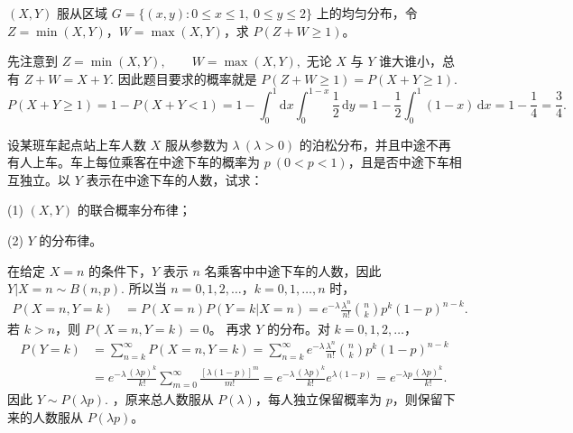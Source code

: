 \documentclass[lang=cn,11pt]{elegantbook}
\begin{document}
\begin{exercise}[min+max=X+Y] \label{exer:3-c10b}
$(X,Y)$ 服从区域 $G=\{(x,y):0\leqslant x\leqslant 1,\ 0\leqslant y\leqslant 2\}$ 上的均匀分布，令 $Z=\min(X,Y)$，$W=\max(X,Y)$，求 $P(Z+W \geqslant 1)$。
\end{exercise}
\begin{solution}
先注意到
\(
Z=\min(X,Y),\qquad W=\max(X,Y),
\)
无论 \(X\) 与 \(Y\) 谁大谁小，总有
\(
Z+W=X+Y.
\)
因此题目要求的概率就是
\(
P(Z+W\geqslant 1)=P(X+Y\geqslant 1).
\)
\[
P(X+Y \geqslant 1) = 1 - P(X+Y < 1) = 1 - \int_0^1\mathrm{d}x\int_0^{1-x}\frac{1}{2}\,\mathrm{d}y = 1 - \frac{1}{2}\int_0^1(1-x)\,\mathrm{d}x = 1-\frac{1}{4} = \frac{3}{4}.
\]
\end{solution}


\begin{exercise}\label{exer:src-2004-2a-15}
设某班车起点站上车人数 \(X\) 服从参数为 \(\lambda\ (\lambda>0)\) 的泊松分布，并且中途不再有人上车。车上每位乘客在中途下车的概率为 \(p\ (0<p<1)\)，且是否中途下车相互独立。以 \(Y\) 表示在中途下车的人数，试求：\par
(1) \((X,Y)\) 的联合概率分布律；\par
(2) \(Y\) 的分布律。
\end{exercise}
\begin{solution}
在给定 \(X=n\) 的条件下，\(Y\) 表示 \(n\) 名乘客中中途下车的人数，因此
\(
Y|X=n\sim B(n,p).
\)
所以当 \(n=0,1,2,\dots\)，\(k=0,1,\dots,n\) 时，
\[
\begin{aligned}
P(X=n,Y=k)
&=P(X=n)P(Y=k|X=n)=e^{-\lambda}\frac{\lambda^n}{n!}\binom nkp^k(1-p)^{n-k}.
\end{aligned}
\]
若 \(k>n\)，则 \(P(X=n,Y=k)=0\)。
再求 \(Y\) 的分布。对 \(k=0,1,2,\dots\)，
\[
\begin{aligned}
P(Y=k)
&=\sum_{n=k}^{\infty}P(X=n,Y=k)=\sum_{n=k}^{\infty}e^{-\lambda}\frac{\lambda^n}{n!}\binom nkp^k(1-p)^{n-k}\\
&=e^{-\lambda}\frac{(\lambda p)^k}{k!}
\sum_{m=0}^{\infty}\frac{[\lambda(1-p)]^m}{m!}=e^{-\lambda}\frac{(\lambda p)^k}{k!}e^{\lambda(1-p)}
=e^{-\lambda p}\frac{(\lambda p)^k}{k!}.
\end{aligned}
\]
因此
\(
Y\sim P(\lambda p).
\)
，原来总人数服从 \(P(\lambda)\)，每人独立保留概率为 \(p\)，则保留下来的人数服从 \(P(\lambda p)\)。
\end{solution}
\end{document}
